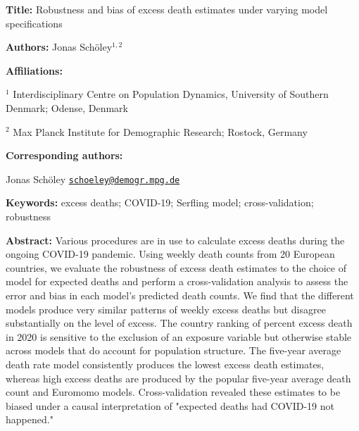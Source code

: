 \documentclass[12pt]{article}
\begin{document}
\begin{titlepage}

{\textbf{Title:}
Robustness and bias of excess death estimates under varying model specifications
\par\medskip}

{\textbf{Authors:}
Jonas Schöley$^{1,2}$
\par\medskip}

{\textbf{Affiliations:}\par
$^1$ Interdisciplinary Centre on Population Dynamics, University of Southern Denmark; Odense, Denmark\par
$^2$ Max Planck Institute for Demographic Research; Rostock, Germany\par
\par\medskip}

{\textbf{Corresponding authors:}\par
Jonas Schöley \href{mailto:schoeley@demogr.mpg.de}{\texttt{schoeley@demogr.mpg.de}}\par
\par\medskip}

{\textbf{Keywords:}
excess deaths; COVID-19; Serfling model; cross-validation; robustness
\par\medskip}

{\textbf{Abstract:}
Various procedures are in use to calculate excess deaths during the ongoing COVID-19 pandemic. Using weekly death counts from 20 European countries, we evaluate the robustness of excess death estimates to the choice of model for expected deaths and perform a cross-validation analysis to assess the error and bias in each model's predicted death counts. We find that the different models produce very similar patterns of weekly excess deaths but disagree substantially on the level of excess. The country ranking of percent excess death in 2020 is sensitive to the exclusion of an exposure variable but otherwise stable across models that do account for population structure. The five-year average death rate model consistently produces the lowest excess death estimates, whereas high excess deaths are produced by the popular five-year average death count and Euromomo models. Cross-validation revealed these estimates to be biased under a causal interpretation of "expected deaths had COVID-19 not happened."
\par\medskip}


\end{titlepage}
\end{document}
